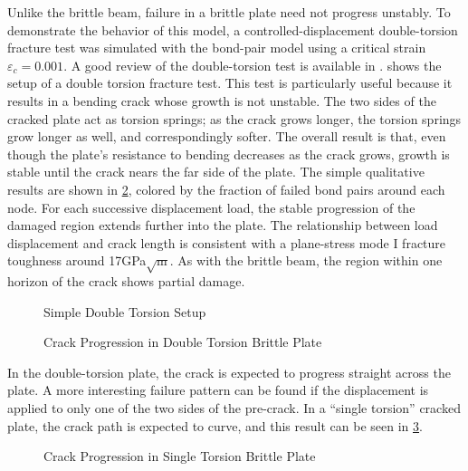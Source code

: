 Unlike the brittle beam, failure in a brittle plate need not progress unstably. 
To demonstrate the behavior of this model, a controlled-displacement double-torsion fracture test was simulated with the bond-pair model using a critical strain $\varepsilon_c = 0.001$. 
A good review of the double-torsion test is available in \cite{shyam2006double}. 
 shows the setup of a double torsion fracture test. 
This test is particularly useful because it results in a bending crack whose growth is not unstable.
The two sides of the cracked plate act as torsion springs; as the crack grows longer, the torsion springs grow longer as well, and correspondingly softer.
The overall result is that, even though the plate's resistance to bending decreases as the crack grows, growth is stable until the crack nears the far side of the plate. 
The simple qualitative results are shown in \cref{fig:DTdamage}, colored by the fraction of failed bond pairs around each node. 
For each successive displacement load, the stable progression of the damaged region extends further into the plate. 
The relationship between load displacement and crack length is consistent with a plane-stress mode I fracture toughness around 17GPa$\sqrt{\textrm{m}}$.
As with the brittle beam, the region within one horizon of the crack shows partial damage.
%
\begin{figure}[tbhp]
  \centering
  
  \caption{Simple Double Torsion Setup}
  \label{fig:DTsetup}
\end{figure}
%

%
\begin{figure}[tbhp]
  \centering
  \resizebox{0.8\linewidth}{!}{}
  \caption{Crack Progression in Double Torsion Brittle Plate}
  \label{fig:DTdamage}
\end{figure}
%
In the double-torsion plate, the crack is expected to progress straight across the plate.
A more interesting failure pattern can be found if the displacement is applied to only one of the two sides of the pre-crack.
In a ``single torsion'' cracked plate, the crack path is expected to curve, and this result can be seen in \cref{fig:SingleTorsion}.
%
\begin{figure}[tbhp]
  \centering
  \resizebox{0.8\linewidth}{!}{}
  \caption{Crack Progression in Single Torsion Brittle Plate}
  \label{fig:SingleTorsion}
\end{figure}
%

\FloatBarrier

